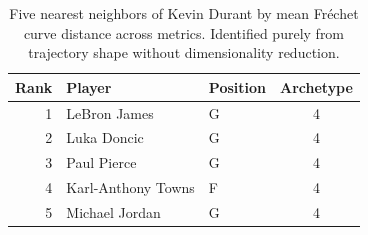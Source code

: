 \begin{table}[htbp]
  \centering\small
  \begin{tabular}{rllc}
    \toprule
    Rank & Player & Position & Archetype \\
    \midrule
    1 & LeBron James & G & 4 \\
    2 & Luka Doncic & G & 4 \\
    3 & Paul Pierce & G & 4 \\
    4 & Karl-Anthony Towns & F & 4 \\
    5 & Michael Jordan & G & 4 \\
    \bottomrule
  \end{tabular}
  \caption{Five nearest neighbors of Kevin Durant by mean Fr\'{e}chet curve distance across metrics. Identified purely from trajectory shape without dimensionality reduction.}
  \label{tab:Kevin_Durant_frechet_curve_neighbors}
\end{table}

